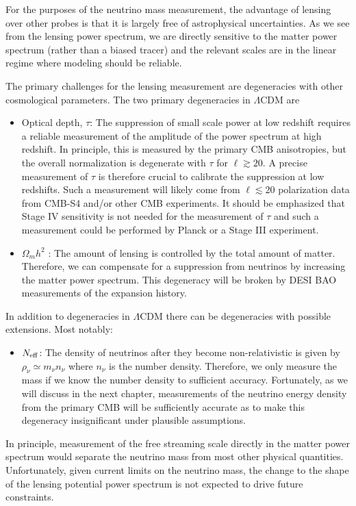 For the purposes of the neutrino mass measurement, the advantage of lensing over other probes is that it is largely free of astrophysical uncertainties.  As we see from the lensing power spectrum, we are directly sensitive to the matter power spectrum (rather than a biased tracer) and the relevant scales are in the linear regime where modeling should be reliable.

The primary challenges for the lensing measurement are degeneracies with other cosmological parameters.  The two primary degeneracies in $\Lambda$CDM are
\begin{itemize}
\item Optical depth, $\tau$: The suppression of small scale power at low redshift requires a reliable measurement of the amplitude of the power spectrum at high redshift.  In principle, this is measured by the primary CMB anisotropies, but the overall normalization is degenerate with $\tau$ for $\ell \gtrsim 20$.  A precise measurement of $\tau$ is therefore crucial to calibrate the suppression at low redshifts.  Such a measurement will likely come from $\ell \lesssim 20$ polarization data from CMB-S4 and/or other CMB experiments.  It should be emphasized that Stage IV sensitivity is not needed for the measurement of $\tau$ and such a measurement could be performed by Planck or a Stage III experiment.


\item $\Omega_m h^2$ : The amount of lensing is controlled by the total amount of matter.  Therefore, we can compensate for a suppression from neutrinos by increasing the matter power spectrum.  This degeneracy will be broken by DESI BAO measurements of the expansion history.
\end{itemize}
In addition to degeneracies in $\Lambda$CDM there can be degeneracies with possible extensions.  Most notably:
\begin{itemize}
\item $N_{\rm eff}$: The density of neutrinos after they become non-relativistic is given by $\rho_\nu \simeq m_\nu n_\nu$ where $n_\nu$ is the number density.  Therefore, we only measure the mass if we know the number density to sufficient accuracy.  Fortunately, as we will discuss in the next chapter, measurements of the neutrino energy density from the primary CMB will be sufficiently accurate as to make this degeneracy insignificant under plausible assumptions.
\end{itemize}
In principle, measurement of the free streaming scale directly in the matter power spectrum would separate the neutrino mass from most other physical quantities.  Unfortunately, given current limits on the neutrino mass, the change to the shape of the lensing potential power spectrum is not expected to drive future constraints.  

